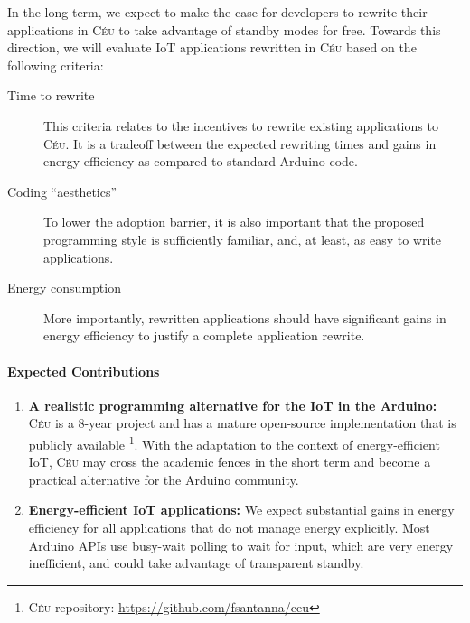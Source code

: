 \documentclass[12pt,english]{amsart}
\newcommand{\CEU}{\textsc{C\'{e}u}\xspace}
\begin{document}
In the long term, we expect to make the case for
developers to rewrite their applications in \CEU to take advantage of standby
modes for free.
%
Towards this direction, we will evaluate IoT applications rewritten in \CEU based on
the following criteria:
%
\begin{description}
\item[Time to rewrite]
This criteria relates to the incentives to rewrite existing applications to
\CEU.
It is a tradeoff between the expected rewriting times and gains in energy
efficiency as compared to standard Arduino code.
\item[Coding ``aesthetics'']
To lower the adoption barrier, it is also important that the proposed
programming style is sufficiently familiar, and, at least, as easy to write applications.
\item[Energy consumption]
More importantly, rewritten applications should have significant gains in
energy efficiency to justify a complete application rewrite.
\end{description}

\paragraph{\textbf{Expected Contributions}}
\begin{enumerate}
\item \textbf{A realistic programming alternative for the IoT in the Arduino:}
    \CEU is a 8-year project and has a mature open-source implementation that
    is publicly available%
\footnote{\CEU repository: \url{https://github.com/fsantanna/ceu}}.
    With the adaptation to the context of energy-efficient IoT, \CEU may cross
    the academic fences in the short term and become a practical alternative
    for the Arduino community.
\item \textbf{Energy-efficient IoT applications:}
    We expect substantial gains in energy efficiency for all applications that
    do not manage energy explicitly.
    Most Arduino APIs use busy-wait polling to wait for input, which are very
    energy inefficient, and could take advantage of transparent standby.
\end{enumerate}
\end{document}
